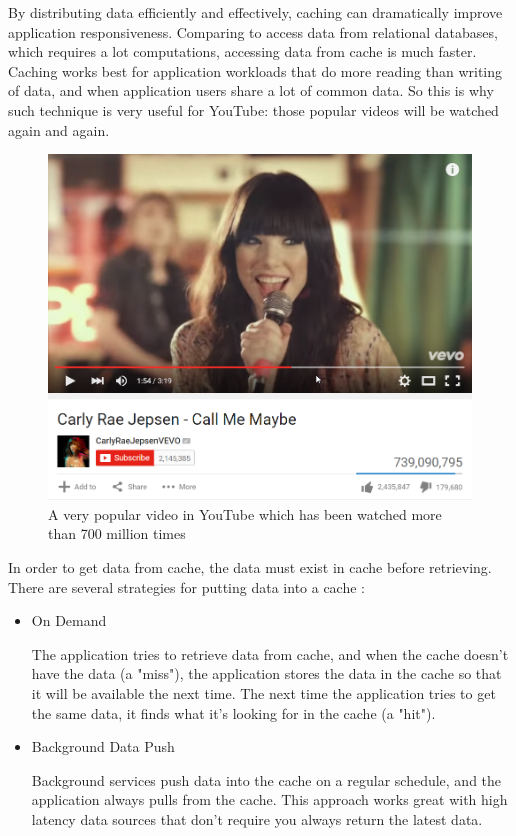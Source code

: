 By distributing data efficiently and effectively, caching can dramatically improve application responsiveness. Comparing to access data from relational databases, which requires a lot computations, accessing data from cache is much faster. Caching works best for application workloads that do more reading than writing of data, and when application users share a lot of common data. So this is why such technique is very useful for YouTube: those popular videos will be watched again and again.

\begin{figure}[H]
	\centering
	\includegraphics[width=0.7\linewidth]{CallMeMaybe.png}
	\caption{A very popular video in YouTube which has been watched more than 700 million times}
\end{figure}

In order to get data from cache, the data must exist in cache before retrieving. There are several strategies for putting data into a cache \cite{azure:distributed}:
\begin{itemize}
	\item On Demand

	The application tries to retrieve data from cache, and when the cache doesn't have the data (a "miss"), the application stores the data in the cache so that it will be available the next time. The next time the application tries to get the same data, it finds what it's looking for in the cache (a "hit").

	\item Background Data Push

	Background services push data into the cache on a regular schedule, and the application always pulls from the cache. This approach works great with high latency data sources that don't require you always return the latest data.
\end{itemize}

